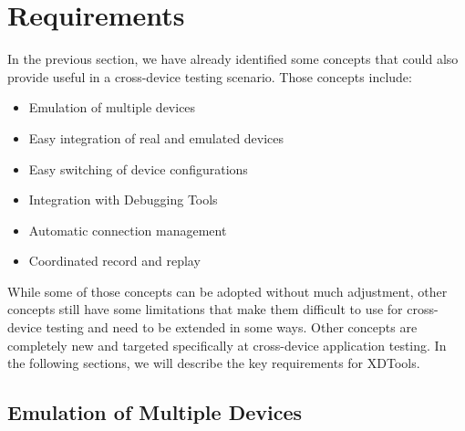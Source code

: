 \chapter{Requirements}

In the previous section, we have already identified some concepts that could also provide useful in a cross-device testing scenario. Those concepts include:
\begin{itemize}
	\item Emulation of multiple devices
	\item Easy integration of real and emulated devices
	\item Easy switching of device configurations
	\item Integration with Debugging Tools
	\item Automatic connection management
	\item Coordinated record and replay
\end{itemize}

While some of those concepts can be adopted without much adjustment, other concepts still have some limitations that make them difficult to use for cross-device testing and need to be extended in some ways. Other concepts are completely new and targeted specifically at cross-device application testing. In the following sections, we will describe the key requirements for XDTools.

\section{Emulation of Multiple Devices}

